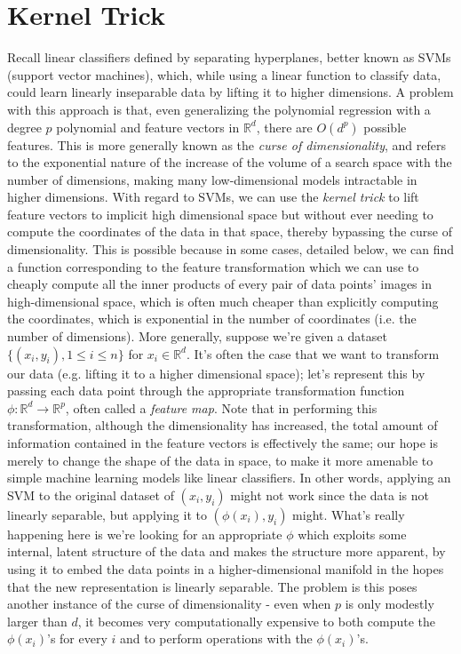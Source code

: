 \documentclass{article}
\begin{document}
\section{Kernel Trick}
Recall linear classifiers defined by separating hyperplanes, better known as SVMs (support vector machines), which, while using a linear function to classify data, could learn linearly inseparable data by lifting it to higher dimensions. A problem with this approach is that, even generalizing the polynomial regression with a degree $ p $ polynomial and feature vectors in $ \mathbb{R}^d $, there are $ O(d^p) $ possible features. This is more generally known as the \textit{curse of dimensionality}, and refers to the exponential nature of the increase of the volume of a search space with the number of dimensions, making many low-dimensional models intractable in higher dimensions.
\newline
With regard to SVMs, we can use the \textit{kernel trick} to lift feature vectors to implicit high dimensional space but without ever needing to compute the coordinates of the data in that space, thereby bypassing the curse of dimensionality. This is possible because in some cases, detailed below, we can find a function corresponding to the feature transformation which we can use to cheaply compute all the inner products of every pair of data points' images in high-dimensional space, which is often much cheaper than explicitly computing the coordinates, which is exponential in the number of coordinates (i.e. the number of dimensions).
\newline \newline
More generally, suppose we're given a dataset $ \{ (x_i, y_i), 1 \leq i \leq n \} $ for $ x_i \in \mathbb{R}^d $. It's often the case that we want to transform our data (e.g. lifting it to a higher dimensional space); let's represent this by passing each data point through the appropriate transformation function $ \phi: \mathbb{R}^d \rightarrow \mathbb{R}^p $, often called a \textit{feature map}. Note that in performing this transformation, although the dimensionality has increased, the total amount of information contained in the feature vectors is effectively the same; our hope is merely to change the shape of the data in space, to make it more amenable to simple machine learning models like linear classifiers. In other words, applying an SVM to the original dataset of $ (x_i, y_i) $ might not work since the data is not linearly separable, but applying it to $ (\phi(x_i), y_i) $ might. What's really happening here is we're looking for an appropriate $ \phi $ which exploits some internal, latent structure of the data and makes the structure more apparent, by using it to embed the data points in a higher-dimensional manifold in the hopes that the new representation is linearly separable. The problem is this poses another instance of the curse of dimensionality - even when $ p $ is only modestly larger than $ d $, it becomes very computationally expensive to both compute the $ \phi(x_i) $'s for every $ i $ and to perform operations with the $ \phi(x_i) $'s.
\end{document}

